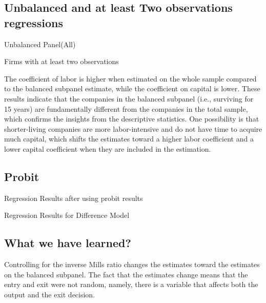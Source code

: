 \subsection{Unbalanced and at least Two observations regressions}

\begin{table}[h]
\parbox{.45\linewidth}{
    \centering
    \small
    
    \caption{Unbalanced Panel(All)}
    \label{tab:my_label}
    }
    \quad
    \parbox{.45\linewidth}{
    \centering
    \small
    
    \caption{Firms with at least two observations}
    \label{tab:my_label}
    }
\end{table}


The coefficient of labor is higher when estimated on the whole sample compared to the balanced subpanel estimate, while the coefficient on capital is lower. These results indicate that the companies in the balanced subpanel (i.e., surviving for 15 years) are fundamentally different from the companies in the total sample, which confirms the insights from the descriptive statistics. One possibility is that shorter-living companies are more labor-intensive and do not have time to acquire much capital, which shifts the estimates toward a higher labor coefficient and a lower capital coefficient when they are included in the estimation.\\

\subsection{Probit}

\begin{table}[h]
\parbox{.45\linewidth}{
    \centering
    \small
    
    \caption{Regression Results after using probit results}
    \label{tab:my_label}
}
\quad
\parbox{.45\linewidth}{
    \centering
    \small
    
    \caption{Regression Results for Difference Model}
    \label{tab:my_label}
    }
\end{table}

\subsection{What we have learned?}
Controlling for the inverse Mills ratio changes the estimates toward the estimates on the balanced subpanel. The fact that the estimates change means that the entry and exit were not random, namely, there is a variable that affects both the output and the exit decision. 